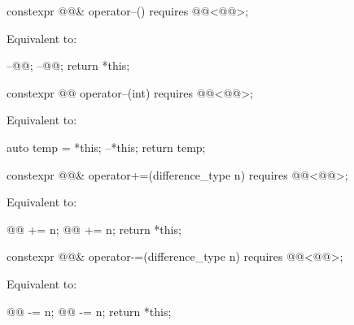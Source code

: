 %
\begin{itemdecl}
constexpr @@& operator--() requires @@<@@>;
\end{itemdecl}

\begin{itemdescr}
\pnum
\effects
Equivalent to:
\begin{codeblock}
--@@;
--@@;
return *this;
\end{codeblock}
\end{itemdescr}

%
\begin{itemdecl}
constexpr @@ operator--(int) requires @@<@@>;
\end{itemdecl}

\begin{itemdescr}
\pnum
\effects
Equivalent to:
\begin{codeblock}
auto temp = *this;
--*this;
return temp;
\end{codeblock}
\end{itemdescr}

%
\begin{itemdecl}
constexpr @@& operator+=(difference_type n)
  requires @@<@@>;
\end{itemdecl}

\begin{itemdescr}
\pnum
\effects
Equivalent to:
\begin{codeblock}
@@ += n;
@@ += n;
return *this;
\end{codeblock}
\end{itemdescr}

%
\begin{itemdecl}
constexpr @@& operator-=(difference_type n)
  requires @@<@@>;
\end{itemdecl}

\begin{itemdescr}
\pnum
\effects
Equivalent to:
\begin{codeblock}
@@ -= n;
@@ -= n;
return *this;
\end{codeblock}
\end{itemdescr}

